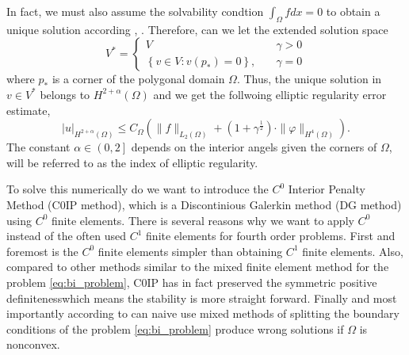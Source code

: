 In fact, we must also assume the solvability condtion $ \int_{\Omega }^{} f dx = 0$ to obtain a unique solution according  \cite{brenner2012}, \cite{gu2012c0}. Therefore, can we let the extended solution space \[
V^{*} = \begin{cases}
    V \quad & \gamma > 0 \\
    \left\{ v \in V: v\left( p_{*} \right)  = 0\right\}, \quad & \gamma = 0
\end{cases}
\]
where $p_{*}$ is a corner of the polygonal domain $\Omega $.
Thus, the unique solution in $v \in V^{*}$ belongs to $H^{2 + \alpha }\left( \Omega  \right) $ and we get the follwoing
elliptic regularity error estimate,
\begin{equation}
\label{eq:bi_harmonic_ellitpic_regularity}
\left| u \right| _{H^{2 + \alpha }\left( \Omega  \right) }  \le C_{\Omega } \left( \| f \|_{  L_{2}( \Omega ) }^{  } + ( 1 + \gamma ^{\frac{1}{2}}
) \cdot \| \varphi  \|_{ H^{4}\left( \Omega  \right)  }^{  }    \right).
\end{equation}
The constant $\alpha \in \left( 0,2\right] $ depends on the interior angels given the corners of $\Omega $, will be referred to as the index of
elliptic regularity.

To solve this numerically do we want to introduce the $C^{0}$ Interior Penalty Method (C0IP method), which is a Discontinious Galerkin
method (DG method) using $C^{0}$ finite elements. There is several reasons why we want to apply $C^{0}$ instead of the often used
$C^{1}$ finite elements for fourth order problems. First and foremost is the $C^0$ finite elements simpler than
obtaining $C^{1}$ finite elements.  Also, compared to other methods similar to the mixed
finite element method for the problem \eqref{eq:bi_problem}, C0IP has in fact
preserved the symmetric positive definitenesswhich means the stability is more straight forward. Finally and most
importantly according to \cite{brenner2012quadratic} can naive use mixed methods of splitting the boundary conditions of
the problem
\eqref{eq:bi_problem} produce wrong solutions if $\Omega $ is nonconvex.


